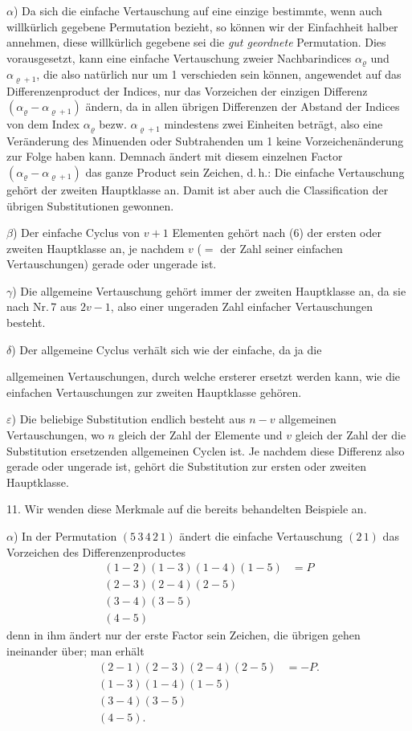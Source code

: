 \documentclass[11pt]{article}
\providecommand{\weberpage}[1]{}
\begin{document}
$\alpha$) Da sich die einfache Vertauschung auf eine einzige bestimmte, wenn auch willkürlich gegebene Permutation bezieht, so können wir der Einfachheit halber annehmen, diese willkürlich gegebene sei die \emph{gut geordnete} Permutation. Dies vorausgesetzt, kann eine einfache Vertauschung zweier Nachbarindices $\alpha_\varrho$ und $\alpha_{\varrho+1}$, die also natürlich nur um 1 verschieden sein können, angewendet auf das Differenzenproduct der Indices, nur das Vorzeichen der einzigen Differenz $(\alpha_\varrho - \alpha_{\varrho+1})$ ändern, da in allen übrigen Differenzen der Abstand der
Indices von dem Index $\alpha_\varrho$ bezw. $\alpha_{\varrho+1}$ mindestens zwei Einheiten beträgt, also eine Veränderung des Minuenden oder Subtrahenden um 1 keine Vorzeichenänderung zur Folge haben kann. Demnach ändert mit diesem einzelnen Factor $(\alpha_\varrho - \alpha_{\varrho+1})$ das ganze Product sein Zeichen, d.\,h.: \glqq Die einfache Vertauschung gehört der zweiten Hauptklasse an.\grqq{} Damit ist aber auch die Classification der übrigen Substitutionen gewonnen.

$\beta$) Der einfache Cyclus von $v+1$ Elementen gehört nach (6) der ersten oder zweiten Hauptklasse an, je nachdem $v$ ($=$ der Zahl seiner einfachen Vertauschungen) gerade oder ungerade ist.

$\gamma$) Die allgemeine Vertauschung gehört immer der zweiten Hauptklasse an, da sie nach Nr.\,7 aus $2v-1$, also einer ungeraden Zahl einfacher Vertauschungen besteht.

$\delta$) Der allgemeine Cyclus verhält sich wie der einfache, da ja die


\weberpage{12}
allgemeinen Vertauschungen, durch welche ersterer ersetzt werden kann, wie die einfachen Vertauschungen zur zweiten Hauptklasse gehören.

$\varepsilon$) Die beliebige Substitution endlich besteht aus $n-v$ allgemeinen Vertauschungen, wo $n$ gleich der Zahl der Elemente und $v$ gleich der Zahl der die Substitution ersetzenden allgemeinen Cyclen ist. Je nachdem diese Differenz also gerade oder ungerade ist, gehört die Substitution zur ersten oder zweiten Hauptklasse.

11. Wir wenden diese Merkmale auf die bereits behandelten Beispiele an.

$\alpha$) In der Permutation $(5\,3\,4\,2\,1)$ ändert die einfache Vertauschung $(2\,1)$ das Vorzeichen des Differenzenproductes
\[
\begin{aligned}
(1-2)(1-3)(1-4)(1-5) &= P \\
(2-3)(2-4)(2-5) & \\
(3-4)(3-5) & \\
(4-5) &
\end{aligned}
\]
denn in ihm ändert nur der erste Factor sein Zeichen, die übrigen gehen ineinander über; man erhält
\[
\begin{aligned}
(2-1)(2-3)(2-4)(2-5) &= -P. \\
(1-3)(1-4)(1-5) & \\
(3-4)(3-5) & \\
(4-5). &
\end{aligned}
\]
\end{document}
